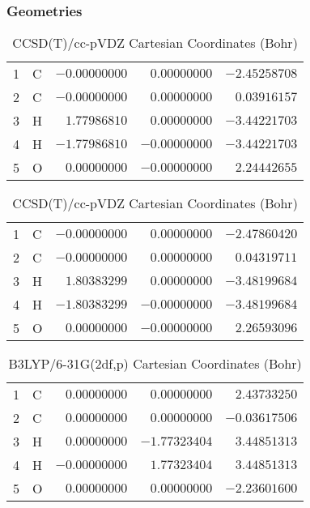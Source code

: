 \documentclass[10pt,oneside]{article}
\begin{document}
\begin{table}[h!]
\subsubsection*{Geometries}
\begin{multicols}{2}
\centering
\caption{CCSD(T)/cc-pVTZ Cartesian Coordinates (Bohr)}
\begin{tabular}{llrrr}
\toprule
1  & C  & $-0.00000000$ & $ 0.00000000$ & $-2.45258708$ \\
2  & C  & $-0.00000000$ & $ 0.00000000$ & $ 0.03916157$ \\
3  & H  & $ 1.77986810$ & $ 0.00000000$ & $-3.44221703$ \\
4  & H  & $-1.77986810$ & $-0.00000000$ & $-3.44221703$ \\
5  & O  & $ 0.00000000$ & $-0.00000000$ & $ 2.24442655$ \\
\bottomrule
\end{tabular}
\caption{CCSD(T)/cc-pVDZ Cartesian Coordinates (Bohr)}
\begin{tabular}{llrrr}
\toprule
1  & C  & $-0.00000000$ & $ 0.00000000$ & $-2.47860420$ \\
2  & C  & $-0.00000000$ & $ 0.00000000$ & $ 0.04319711$ \\
3  & H  & $ 1.80383299$ & $ 0.00000000$ & $-3.48199684$ \\
4  & H  & $-1.80383299$ & $-0.00000000$ & $-3.48199684$ \\
5  & O  & $ 0.00000000$ & $-0.00000000$ & $ 2.26593096$ \\
\bottomrule
\end{tabular}
\end{multicols}
\end{table}

\begin{table}[h]
\centering
\caption{B3LYP/6-31G(2df,p) Cartesian Coordinates (Bohr)}
\begin{tabular}{llrrr}
\toprule
1  & C  & $ 0.00000000$ & $ 0.00000000$ & $ 2.43733250$ \\
2  & C  & $ 0.00000000$ & $ 0.00000000$ & $-0.03617506$ \\
3  & H  & $ 0.00000000$ & $-1.77323404$ & $ 3.44851313$ \\
4  & H  & $-0.00000000$ & $ 1.77323404$ & $ 3.44851313$ \\
5  & O  & $ 0.00000000$ & $ 0.00000000$ & $-2.23601600$ \\
\bottomrule
\end{tabular}
\end{table}
\end{document}
